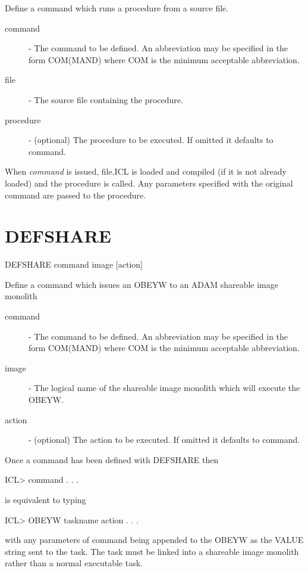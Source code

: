 \documentclass[twoside,11pt,nolof,chapters]{starlink}
\begin{document}
 Define a command which runs a procedure from a source file.

\begin{description}

\item[command] - The command to be defined. An abbreviation
              may be specified in the form COM(MAND) where
              COM is the minimum acceptable abbreviation.

\item[file]  - The source file containing the procedure.

\item[procedure] - (optional)  The procedure to be executed. If
              omitted it defaults to command.

\end{description}

When \emph{command} is issued, file.ICL is loaded and compiled (if it is
not already loaded) and the procedure is called. Any parameters specified
with the original command are passed to the procedure.

\section{DEFSHARE\label{DEFSHARE}}

   DEFSHARE \hspace{.5cm} command \hspace{.5cm} image \hspace{.5cm} [action]

 Define a command which issues an OBEYW to an ADAM shareable image monolith

\begin{description}

\item[command] - The command to be defined. An abbreviation
              may be specified in the form COM(MAND) where
              COM is the minimum acceptable abbreviation.

\item[image] - The logical name of the shareable image monolith
               which will execute the OBEYW.

\item[action] - (optional)  The action to be executed. If
              omitted it defaults to command.

\end{description}
Once a command has been defined with DEFSHARE then
\begin{terminalv}
    ICL> command . . .
\end{terminalv}
is equivalent to typing
\begin{terminalv}
    ICL> OBEYW taskname action . . .
\end{terminalv}
with any parameters of command being appended to the OBEYW as the VALUE
string sent to the task. The task must be linked into a shareable image
monolith rather than a normal executable task.
\end{document}
